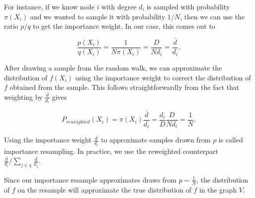 \documentclass[a4paper]{article}
\begin{document}
For instance, if we know node $i$ with degree $d_i$ is sampled with probability $\pi(X_i)$ and we wanted to sample it with probability $1/N$, then we can use the ratio $p/q$ to get the importance weight. In our case, this comes out to

\begin{equation}
\frac{p(X_i)}{q(X_i)} = \frac{1}{N \pi(X_i)} = \frac{D}{N d_i} = \frac{\bar{d}}{d_i}.
\end{equation}

After drawing a sample from the random walk, we can approximate the distribution of $f(X_i)$ using the importance weight to correct the distribution of $f$ obtained from the sample. This follows straightforwardly from the fact that weighting by $\frac{\bar{d}}{d_i}$ gives

\begin{equation}
P_{reweighted}(X_i) = \pi(X_i) \frac{\bar{d}}{d_i} = \frac{d_i}{D} \frac{D}{N d_i} = \frac{1}{N}.
\end{equation}

\noindent
Using the importance weight $\frac{\bar{d}}{d_i}$ to approximate samples drawn from $p$ is called importance resampling. In practice, we use the reweighted counterpart $\frac{\bar{d}}{d_i} / \sum_{j \in \chi} \frac{\bar{d}}{d_j}$.

Since our importance resample approximates draws from $p \sim \frac{1}{N}$, the distribution of $f$ on the resample will approximate the true distribution of $f$ in the graph $V$.
\end{document}
